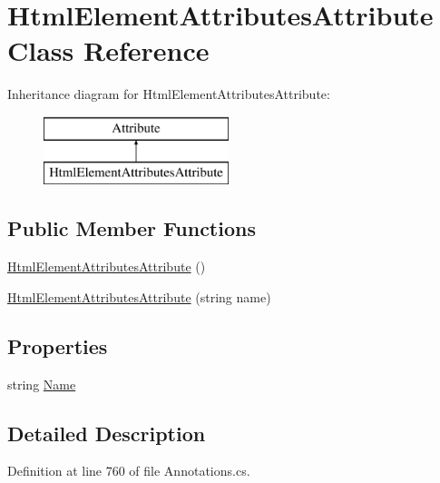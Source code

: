 \hypertarget{class_html_element_attributes_attribute}{}\section{Html\+Element\+Attributes\+Attribute Class Reference}
\label{class_html_element_attributes_attribute}
Inheritance diagram for Html\+Element\+Attributes\+Attribute\+:\begin{figure}[H]
\begin{center}
\leavevmode
\includegraphics[height=2.000000cm]{class_html_element_attributes_attribute}
\end{center}
\end{figure}
\subsection*{Public Member Functions}
\begin{DoxyCompactItemize}
\item 
\hyperlink{class_html_element_attributes_attribute_adc220d1ae81f704213d407d354314658}{Html\+Element\+Attributes\+Attribute} ()
\item 
\hyperlink{class_html_element_attributes_attribute_a021a9fc3f28a9025ade505f85e890810}{Html\+Element\+Attributes\+Attribute} (string name)
\end{DoxyCompactItemize}
\subsection*{Properties}
\begin{DoxyCompactItemize}
\item 
string \hyperlink{class_html_element_attributes_attribute_a6d108098ab54c1770cb01df2e1051fd7}{Name}
\end{DoxyCompactItemize}


\subsection{Detailed Description}


Definition at line 760 of file Annotations.\+cs.



